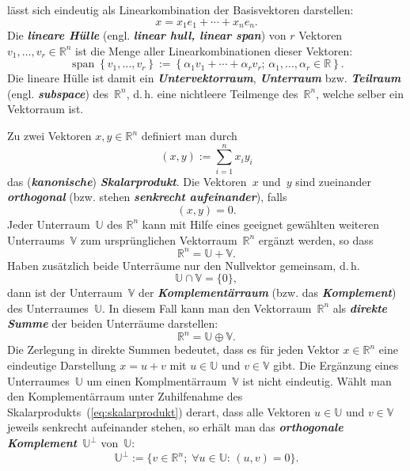 lässt sich eindeutig als Linearkombination der Basisvektoren darstellen:
\[
x=x_{1}e_{1}+\cdots+x_{n}e_{n}.
\]
Die \textbf{\em lineare Hülle} (engl. \textbf{\em linear
hull, linear span}) von $r$ Vektoren $v_{1},\ldots,v_{r}\in{\mathbb{R}}^{n}$
ist die Menge aller Linearkombinationen dieser Vektoren:
\[
{\operatorname{span}}\left\{ v_{1},\ldots,v_{r}\right\} :=\left\{ \alpha_{1}v_{1}+\cdots+\alpha_{r}v_{r};\,\alpha_{1},\ldots,\alpha_{r}\in{\mathbb{R}}\right\} .
\]
Die lineare Hülle ist damit ein \textbf{\em Untervektorraum}, \textbf{\em Unterraum}
bzw. \textbf{\em Teilraum} (engl. \textbf{\em subspace}) des~${\mathbb{R}}^{n}$, d.\,h.
eine nichtleere Teilmenge des~${\mathbb{R}}^{n}$, welche selber ein Vektorraum
ist.

Zu zwei Vektoren $x,y\in{\mathbb{R}}^{n}$ definiert man durch
\begin{equation}
(x,y):=\sum_{i=1}^{n}x_{i}y_{i}\label{eq:skalarprodukt}
\end{equation}
das (\textbf{\em kanonische}) \textbf{\em Skalarprodukt}.
Die Vektoren~$x$ und~$y$ sind zueinander \textbf{\em orthogonal} (bzw.
stehen \textbf{\em senkrecht aufeinander}), falls
\[
(x,y)=0.
\]
Jeder Unterraum~$\mathbb{U}$ des ${\mathbb{R}}^{n}$ kann mit Hilfe eines
geeignet gewählten weiteren Unterraums~$\mathbb{V}$ zum ursprünglichen
Vektorraum~${\mathbb{R}}^{n}$ ergänzt werden, so dass
\[
{\mathbb{R}}^{n}=\mathbb{U}+\mathbb{V}.
\]
Haben zusätzlich beide Unterräume nur den Nullvektor gemeinsam, d.\,h.
\[
\mathbb{U}\cap\mathbb{V}=\{0\},
\]
dann ist der Unterraum~$\mathbb{V}$ der \textbf{\em Komplementärraum}
(bzw. das \textbf{\em Komplement}) des Unterraumes~$\mathbb{U}$. In diesem
Fall kann man den Vektorraum~${\mathbb{R}}^{n}$ als \textbf{\em direkte Summe} der
beiden Unterräume darstellen:
\[
{\mathbb{R}}^{n}=\mathbb{U}\oplus\mathbb{V}.
\]
Die Zerlegung in direkte Summen bedeutet, dass es für jeden Vektor
$x\in{\mathbb{R}}^{n}$ eine eindeutige Darstellung $x=u+v$ mit $u\in\mathbb{U}$
und $v\in\mathbb{V}$ gibt.
Die Ergänzung eines Unterraumes~$\mathbb{U}$ um einen Komplmentärraum~$\mathbb{V}$
ist nicht eindeutig. Wählt man den Komplementärraum unter Zuhilfenahme
des Skalarprodukts~(\ref{eq:skalarprodukt}) derart, dass alle Vektoren
$u\in\mathbb{U}$ und $v\in\mathbb{V}$ jeweils senkrecht aufeinander
stehen, so erhält man das \textbf{\em orthogonale Komplement}~$\mathbb{U}^{\perp}$
von~$\mathbb{U}$:
\begin{equation}
\mathbb{U}^{\perp}:=\{v\in{\mathbb{R}}^{n};\;\forall u\in\mathbb{U}:\,(u,v)=0\}.\label{eq:ortho-komplement}
\end{equation}
